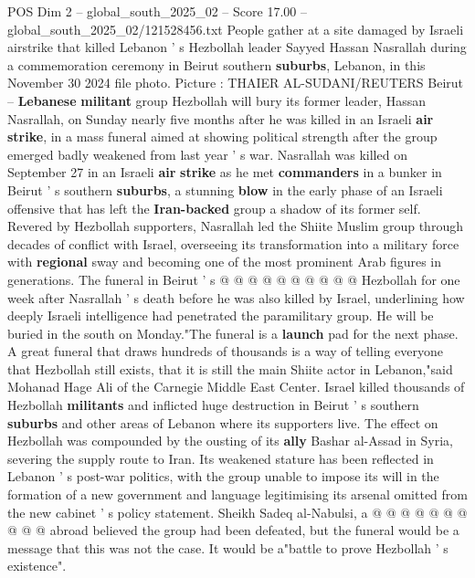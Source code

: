 \begin{textsample}{POS Dim 2 – global\_south\_2025\_02 – Score 17.00 – global\_south\_2025\_02/121528456.txt}  \label{ex:f2_pos_371}
People gather at a site damaged by Israeli airstrike that killed Lebanon ' s Hezbollah leader Sayyed Hassan Nasrallah during a commemoration ceremony in Beirut southern \textbf{suburbs}, Lebanon, in this November 30 2024 file photo.
Picture : THAIER AL-SUDANI/REUTERS Beirut -- \textbf{Lebanese} \textbf{militant} group Hezbollah will bury its former leader, Hassan Nasrallah, on Sunday nearly five months after he was killed in an Israeli \textbf{air} \textbf{strike}, in a mass funeral aimed at showing political strength after the group emerged badly weakened from last year ' s war.
Nasrallah was killed on September 27 in an Israeli \textbf{air} \textbf{strike} as he met \textbf{commanders} in a bunker in Beirut ' s southern \textbf{suburbs}, a stunning \textbf{blow} in the early phase of an Israeli offensive that has left the \textbf{Iran-backed} group a shadow of its former self.
Revered by Hezbollah supporters, Nasrallah led the Shiite Muslim group through decades of conflict with Israel, overseeing its transformation into a military force with \textbf{regional} sway and becoming one of the most prominent Arab figures in generations.
The funeral in Beirut ' s @ @ @ @ @ @ @ @ @ @ Hezbollah for one week after Nasrallah ' s death before he was also killed by Israel, underlining how deeply Israeli intelligence had penetrated the paramilitary group.
He will be buried in the south on Monday."The funeral is a \textbf{launch} pad for the next phase.
A great funeral that draws hundreds of thousands is a way of telling everyone that Hezbollah still exists, that it is still the main Shiite actor in Lebanon,"said Mohanad Hage Ali of the Carnegie Middle East Center.
Israel killed thousands of Hezbollah \textbf{militants} and inflicted huge destruction in Beirut ' s southern \textbf{suburbs} and other areas of Lebanon where its supporters live.
The effect on Hezbollah was compounded by the ousting of its \textbf{ally} Bashar al-Assad in Syria, severing the supply route to Iran.
Its weakened stature has been reflected in Lebanon ' s post-war politics, with the group unable to impose its will in the formation of a new government and language legitimising its arsenal omitted from the new cabinet ' s policy statement.
Sheikh Sadeq al-Nabulsi, a @ @ @ @ @ @ @ @ @ @ abroad believed the group had been defeated, but the funeral would be a message that this was not the case.
It would be a"battle to prove Hezbollah ' s existence".

\end{textsample}
